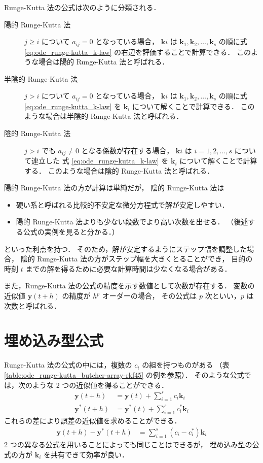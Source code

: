 Runge-Kutta 法の公式は次のように分類される．

\begin{description}
    \item[陽的 Runge-Kutta 法] $j \ge i$ について $a_{ij} = 0$ となっている場合，
          $\bm{k}i$ は $\bm{k}_1, \bm{k}_2, \ldots, \bm{k}_s$
          の順に式 \eqref{eq:ode_runge-kutta_k-law} の右辺を評価することで計算できる．
          このような場合は陽的 Runge-Kutta 法と呼ばれる．
    \item[半陰的 Runge-Kutta 法] $j > i$ について $a_{ij} = 0$ となっている場合，
          $\bm{k}i$ は $\bm{k}_1, \bm{k}_2, \ldots, \bm{k}_s$
          の順に式 \eqref{eq:ode_runge-kutta_k-law} を $\bm{k}_i$ について解くことで計算できる．
          このような場合は半陰的 Runge-Kutta 法と呼ばれる．
    \item[陰的 Runge-Kutta 法] $j > i$ でも $a_{ij} \neq 0$ となる係数が存在する場合，
          $\bm{k}i$ は $i = 1, 2, \ldots, s$ について連立した
          式 \eqref{eq:ode_runge-kutta_k-law} を $\bm{k}_i$ について解くことで計算する．
          このような場合は陰的 Runge-Kutta 法と呼ばれる．
\end{description}

陽的 Runge-Kutta 法の方が計算は単純だが，
陰的 Runge-Kutta 法は

\begin{itemize}
    \item 硬い系と呼ばれる比較的不安定な微分方程式で解が安定しやすい．
    \item 陽的 Runge-Kutta 法よりも少ない段数でより高い次数を出せる．
          （後述する公式の実例を見ると分かる．）
\end{itemize}

といった利点を持つ．
そのため，解が安定するようにステップ幅を調整した場合，
陰的 Runge-Kutta 法の方がステップ幅を大きくとることができ，
目的の時刻 $t$ までの解を得るために必要な計算時間は少なくなる場合がある．

また，Runge-Kutta 法の公式の精度を示す数値として次数が存在する．
変数の近似値 $\bm{y}(t + h)$ の精度が $h^p$ オーダーの場合，
その公式は $p$ 次といい，$p$ は次数と呼ばれる．

\section{埋め込み型公式}

Runge-Kutta 法の公式の中には，複数の $c_i$ の組を持つものがある
（表 \ref{table:ode_runge-kutta_butcher-array-rkf45} の例を参照）．
そのような公式では，次のような 2 つの近似値を得ることができる．
\begin{align}
    \bm{y}(t + h)   & = \bm{y}(t) + \sum_{i=1}^s c_i \bm{k}_i     \\
    \bm{y}^*(t + h) & = \bm{y}^*(t) + \sum_{i=1}^s c_i^* \bm{k}_i
\end{align}
これらの差により誤差の近似値を求めることができる．
\begin{align}
    \bm{y}(t + h) - \bm{y}^*(t + h) & = \sum_{i=1}^s (c_i - c_i^*) \bm{k}_i
\end{align}
2 つの異なる公式を用いることによっても同じことはできるが，
埋め込み型の公式の方が $\bm{k}_i$ を共有できて効率が良い．

